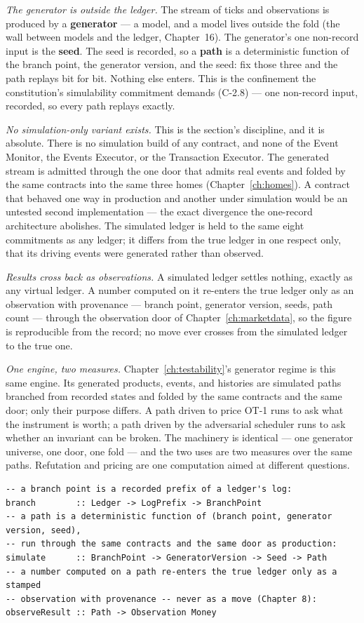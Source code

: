 \emph{The generator is outside the ledger.} The stream of ticks and observations is produced
by a \textbf{generator} --- a model, and a model lives outside the fold (the wall between
models and the ledger, Chapter~16). The generator's one
non-record input is the \textbf{seed}. The seed is recorded, so a \textbf{path} is a
deterministic function of the branch point, the generator version, and the seed: fix those
three and the path replays bit for bit. Nothing else enters. This is the confinement the
constitution's simulability commitment demands (C-2.8) --- one non-record input, recorded,
so every path replays exactly.

\emph{No simulation-only variant exists.} This is the section's discipline, and it is
absolute. There is no simulation build of any contract, and none of the Event Monitor, the
Events Executor, or the Transaction Executor. The generated stream is admitted through the
one door that admits real events and folded by the same contracts into the same three homes
(Chapter~\ref{ch:homes}). A contract that behaved one way in production and another under
simulation would be an untested second implementation --- the exact divergence the
one-record architecture abolishes. The simulated ledger is held to the same eight
commitments as any ledger; it differs from the true ledger in one respect only, that its
driving events were generated rather than observed.

\emph{Results cross back as observations.} A simulated ledger settles nothing, exactly as
any virtual ledger. A number computed on it re-enters the true ledger only as an observation
with provenance --- branch point, generator version, seeds, path count --- through the
observation door of Chapter~\ref{ch:marketdata}, so the figure is reproducible from the
record; no move ever crosses from the simulated ledger to the true one.

\emph{One engine, two measures.} Chapter~\ref{ch:testability}'s generator regime is this same
engine. Its generated products, events, and histories are simulated paths branched from
recorded states and folded by the same contracts and the same door; only their purpose
differs. A path driven to price OT-1 runs to ask what the instrument is worth; a path driven
by the adversarial scheduler runs to ask whether an invariant can be broken. The machinery
is identical --- one generator universe, one door, one fold --- and the two uses are two
measures over the same paths. Refutation and pricing are one computation aimed at different
questions.

\begin{lstlisting}
-- a branch point is a recorded prefix of a ledger's log:
branch        :: Ledger -> LogPrefix -> BranchPoint
-- a path is a deterministic function of (branch point, generator version, seed),
-- run through the same contracts and the same door as production:
simulate      :: BranchPoint -> GeneratorVersion -> Seed -> Path
-- a number computed on a path re-enters the true ledger only as a stamped
-- observation with provenance -- never as a move (Chapter 8):
observeResult :: Path -> Observation Money
\end{lstlisting}
